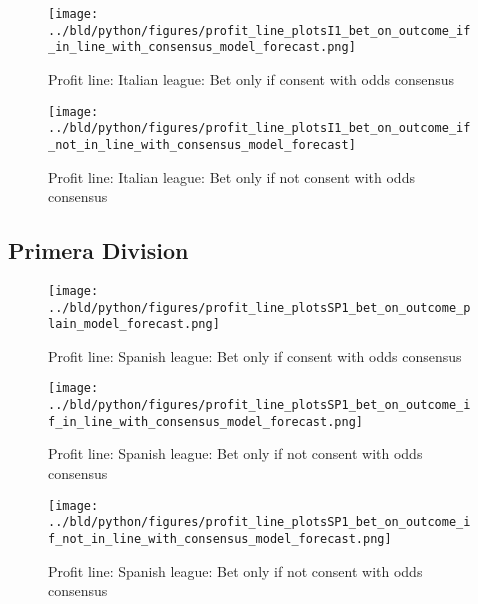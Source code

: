 \documentclass[11pt, a4paper, leqno]{article}
\begin{document}
\begin{figure}[H]
    \centering
    \texttt{[image: ../bld/python/figures/profit\_line\_plotsI1\_bet\_on\_outcome\_if\_in\_line\_with\_consensus\_model\_forecast.png]}
    \caption{Profit line: Italian league: Bet only if consent with odds consensus}
    \label{fig:figure2}
\end{figure}
\begin{figure}[H]
    \centering
    \texttt{[image: ../bld/python/figures/profit\_line\_plotsI1\_bet\_on\_outcome\_if\_not\_in\_line\_with\_consensus\_model\_forecast]}
    \caption{Profit line: Italian league: Bet only if not consent with odds consensus}
    \label{fig:figure2}
\end{figure}



\subsection{Primera Division}
\begin{figure}[H]
    \centering
    \texttt{[image: ../bld/python/figures/profit\_line\_plotsSP1\_bet\_on\_outcome\_plain\_model\_forecast.png]}
    \caption{Profit line: Spanish league: Bet only if consent with odds consensus}
    \label{fig:figure2}
\end{figure}

\begin{figure}[H]
    \centering
    \texttt{[image: ../bld/python/figures/profit\_line\_plotsSP1\_bet\_on\_outcome\_if\_in\_line\_with\_consensus\_model\_forecast.png]}
    \caption{Profit line: Spanish league: Bet only if not consent with odds consensus}
    \label{fig:figure2}
\end{figure}
\begin{figure}[H]
    \centering
    \texttt{[image: ../bld/python/figures/profit\_line\_plotsSP1\_bet\_on\_outcome\_if\_not\_in\_line\_with\_consensus\_model\_forecast.png]}
    \caption{Profit line: Spanish league: Bet only if not consent with odds consensus}
    \label{fig:figure2}
\end{figure}











\end{document}
